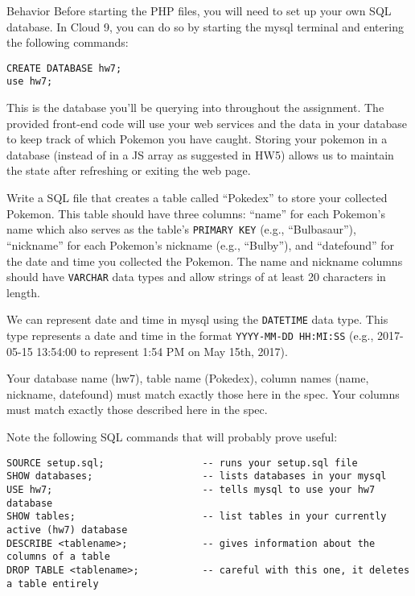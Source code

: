 \documentclass[programming]{../../../../mfcs}
\begin{document}
\begin{question}{Behavior}
  \vspace{1em}
  Before starting the PHP files, you will need to set up your own SQL database. In Cloud 9, you can
  do so by starting the mysql terminal and entering the following commands: 
  \begin{verbatim}
CREATE DATABASE hw7;
use hw7;\end{verbatim}
  This is the database you'll be querying into throughout the assignment. The provided front-end code will use your
  web services and the data in your database to keep track of which Pokemon you have caught. Storing your pokemon in
  a database (instead of in a JS array as suggested in HW5) allows us to maintain the state after refreshing or exiting the web page.
  \newline

  Write a SQL file that creates a table called ``Pokedex'' to store your collected Pokemon. This table
  should have three columns: ``name'' for each Pokemon's name which also serves as the table's
  \texttt{PRIMARY KEY} (e.g., ``Bulbasaur''), ``nickname'' for
  each Pokemon's nickname (e.g., ``Bulby''), and ``datefound'' for the date and time you collected the Pokemon. 
  The name and nickname columns should have
  \texttt{VARCHAR} data types and allow strings of at least 20 characters in length. 
  \newline
  
  We can represent date and time in mysql using the \texttt{DATETIME} data type. This type represents a date and time
  in the format \texttt{YYYY-MM-DD HH:MI:SS} (e.g., 2017-05-15 13:54:00 to represent 1:54 PM on May 15th, 2017).
  \newline

  Your database name (hw7), table name (Pokedex), column names (name, nickname, datefound) must match exactly those
  here in the spec. Your columns must match exactly those described here in the spec.
  \newline

  Note the following SQL commands that will probably prove useful:
  \begin{verbatim}
SOURCE setup.sql;                 -- runs your setup.sql file
SHOW databases;                   -- lists databases in your mysql
USE hw7;                          -- tells mysql to use your hw7 database
SHOW tables;                      -- list tables in your currently active (hw7) database
DESCRIBE <tablename>;             -- gives information about the columns of a table
DROP TABLE <tablename>;           -- careful with this one, it deletes a table entirely\end{verbatim}


\end{question}
\end{document}
